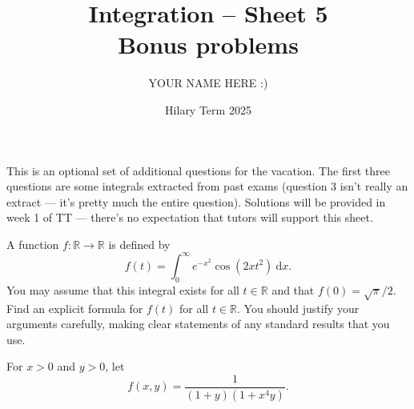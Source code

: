 \documentclass[answers]{exam}
\title{Integration -- Sheet 5\\Bonus problems}
\author{YOUR NAME HERE :)}
\date{Hilary Term 2025}
\begin{document}
\maketitle

This is an optional set of additional questions for the vacation. The first three questions are some integrals extracted from past exams (question 3 isn't really an extract --- it's pretty much the entire question). Solutions will be provided in week 1 of TT --- there's no expectation that tutors will support this sheet.

\begin{questions}

\question%
A function $f: \mathbb{R} \to \mathbb{R}$ is defined by \[
	f(t)=\int_{0}^{\infty} e^{-x^{2}} \cos(2 x t^{2})~\mathrm d x.
\] You may assume that this integral exists for all $t \in \mathbb{R}$ and that $f(0)=\sqrt{\pi} / 2$. Find an explicit formula for $f(t)$ for all $t \in \mathbb{R}$. You should justify your arguments carefully, making clear statements of any standard results that you use.



\question%
For $x>0$ and $y>0$, let \[
	f(x, y)=\frac1{(1+y)(1+x^4y)}.
\]



\question%
\end{questions}
\end{document}
